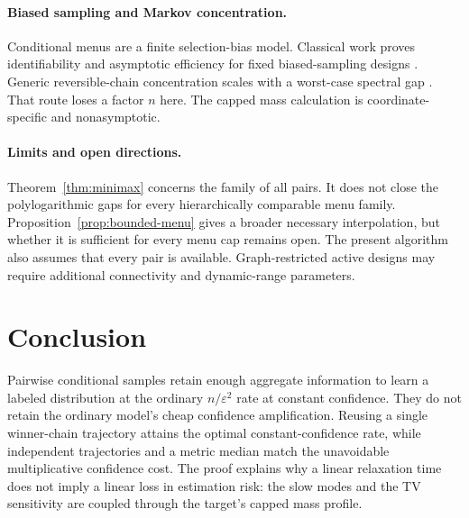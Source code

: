 \documentclass[twoside]{article}
\begin{document}
\paragraph{Biased sampling and Markov concentration.}
Conditional menus are a finite selection-bias model. Classical work proves identifiability and asymptotic efficiency for fixed biased-sampling designs \citep{vardi1985empirical,gill1988large}. Generic reversible-chain concentration scales with a worst-case spectral gap \citep{jiang2018bernstein}. That route loses a factor $n$ here. The capped mass calculation is coordinate-specific and nonasymptotic.

\paragraph{Limits and open directions.}
Theorem~\ref{thm:minimax} concerns the family of all pairs. It does not close the polylogarithmic gaps for every hierarchically comparable menu family. Proposition~\ref{prop:bounded-menu} gives a broader necessary interpolation, but whether it is sufficient for every menu cap remains open. The present algorithm also assumes that every pair is available. Graph-restricted active designs may require additional connectivity and dynamic-range parameters.

\section{Conclusion}

Pairwise conditional samples retain enough aggregate information to learn a labeled distribution at the ordinary $n/\varepsilon^2$ rate at constant confidence. They do not retain the ordinary model's cheap confidence amplification. Reusing a single winner-chain trajectory attains the optimal constant-confidence rate, while independent trajectories and a metric median match the unavoidable multiplicative confidence cost. The proof explains why a linear relaxation time does not imply a linear loss in estimation risk: the slow modes and the TV sensitivity are coupled through the target's capped mass profile.


\end{document}

